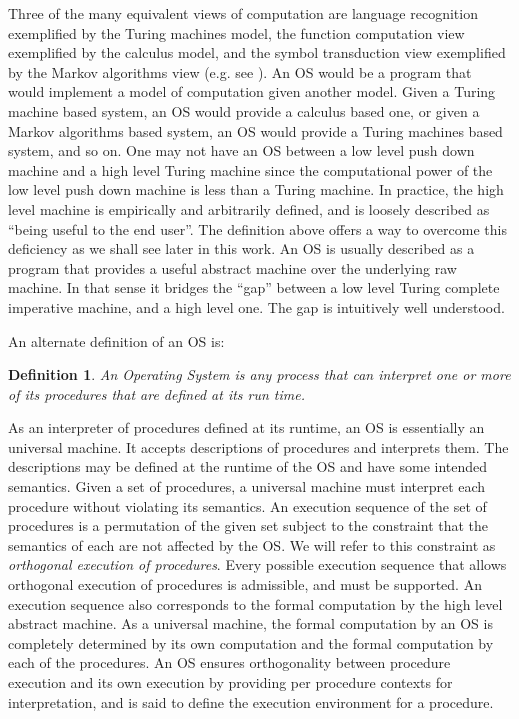 \documentclass[draft]{article}
\newcounter{thedefn}
\newtheorem{mydefinition}[thedefn]{Definition}
\begin{document}
Three  of  the  many  equivalent  views of  computation  are  language
recognition  exemplified by  the Turing  machines model,  the function
computation view exemplified by  the  calculus model, and the
symbol  transduction view  exemplified by  the Markov  algorithms view
(e.g. see  \cite{Taylor:1998:MCF:275566}).  An  OS would be  a program
that  would implement  a  model of  computation  given another  model.
Given a Turing  machine based system, an OS  would provide a 
calculus based one,  or given a Markov algorithms  based system, an OS
would provide a Turing machines based  system, and so on.  One may not
have an  OS between  a low level  push down  machine and a  high level
Turing machine  since the  computational power of  the low  level push
down machine  is less  than a Turing  machine.  In practice,  the high
level machine  is empirically and arbitrarily defined,  and is loosely
described as ``being  useful to the end user''.   The definition above
offers a way to overcome this deficiency as we shall see later in this
work.  An OS is usually described  as a program that provides a useful
abstract machine  over the underlying  raw machine.  In that  sense it
bridges  the ``gap'' between  a low  level Turing  complete imperative
machine,  and  a  high  level   one.   The  gap  is  intuitively  well
understood.

An alternate definition of an OS is:
\begin{mydefinition}
  {An} \emph{Operating  System} is any process that  can interpret one
  or more of its procedures that are defined at its run time.
  \label{def:os:constructive}
\end{mydefinition}

As  an interpreter  of procedures  defined at  its runtime,  an  OS is
essentially  an   universal  machine.   It   accepts  descriptions  of
procedures and  interprets them.  The  descriptions may be  defined at
the runtime of  the OS and have some intended  semantics.  Given a set
of  procedures,  a universal  machine  must  interpret each  procedure
without violating its semantics.  An  execution sequence of the set of
procedures is a permutation of the given set subject to the constraint
that the semantics of each are  not affected by the OS.  We will refer
to  this  constraint  as  \emph{orthogonal execution  of  procedures}.
Every possible execution sequence  that allows orthogonal execution of
procedures  is  admissible,  and  must  be  supported.   An  execution
sequence also corresponds to the  formal computation by the high level
abstract machine.   As a universal machine, the  formal computation by
an OS is  completely determined by its own  computation and the formal
computation by  each of the  procedures.  An OS  ensures orthogonality
between  procedure execution and  its own  execution by  providing per
procedure  contexts for  interpretation,  and is  said  to define  the
execution environment for a procedure.
\end{document}

